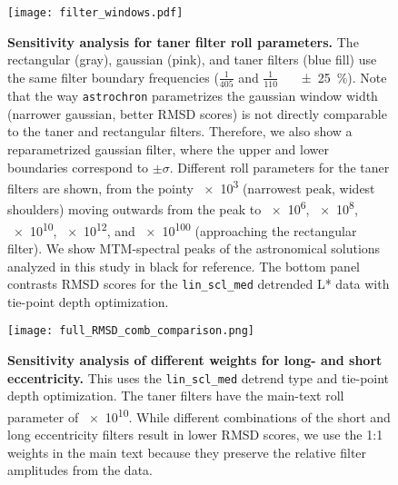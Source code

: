 \documentclass[draft]{agujournal2019}
\begin{document}
\begin{figure}[htb]
  \centering \texttt{[image: filter\_windows.pdf]}
  \caption{\label{fig:filter-windows}
    \textbf{Sensitivity analysis for taner filter roll parameters.}
    The rectangular (gray), gaussian (pink), and taner filters (blue fill)
    use the same filter boundary frequencies (\(\frac{1}{405}\) and \(\frac{1}{110}\)~\si[per-mode=power]{\per\kiloyear} \qty{\pm25}{\percent}).
    Note that the way \texttt{astrochron} parametrizes the gaussian window width (narrower gaussian, better RMSD scores) is not directly comparable to the taner and rectangular filters.
    Therefore, we also show a reparametrized gaussian filter, where the upper and lower boundaries correspond to \(\pm\sigma\).
    Different roll parameters for the taner filters are shown,
    from the pointy \num{e3} (narrowest peak, widest shoulders) moving outwards from the peak to
    \num{e6}, \num{e8}, \num{e10}, \num{e12}, and \num{e100} (approaching the rectangular filter).
    We show MTM-spectral peaks of the astronomical solutions analyzed in this study in black for reference.
    The bottom panel contrasts \gls{RMSD} scores for the \texttt{lin\_scl\_med} detrended \gls{L*} data with tie-point depth optimization.
    }
\end{figure}


\begin{figure}[htb]
  \centering \texttt{[image: full\_RMSD\_comb\_comparison.png]}
  \caption{\label{fig:full-RMSD-comb}
    \textbf{Sensitivity analysis of different weights for long- and short eccentricity.}
    This uses the \texttt{lin\_scl\_med} detrend type and tie-point depth optimization.
    The taner filters have the main-text roll parameter of \num{e10}.
    While different combinations of the short and long eccentricity filters result in lower \gls{RMSD} scores, we use the 1:1 weights in the main text because they preserve the relative filter amplitudes from the data.
    }
\end{figure}


\end{document}

